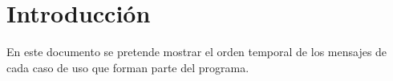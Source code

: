 \section{Introducción}\label{sec:intro}

\begin{flushleft}
En este documento se pretende mostrar el orden temporal de los mensajes de cada caso de uso que forman parte del programa.
\end{flushleft}
